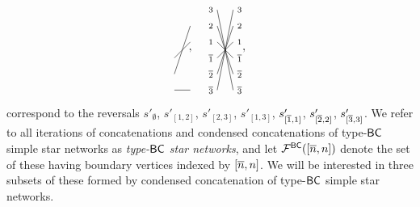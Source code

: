\documentclass[11pt]{article}
\theoremstyle{definition}
\numberwithin{equation}{section}
\begin{document}
\begin{equation}
\begin{tikzpicture}[scale=.5,baseline=0]
\draw[-] (-.5,-0.5) -- (.5,0.5);
\draw[-] (-.5,-1.5) -- (.5,1.5);
\draw[-] (-.5,-2.5) -- (.5,-2.5);
\end{tikzpicture}
\ntnsp,\quad
\begin{tikzpicture}[scale=.5,baseline=0]
  \node at (-.9,2.5) {$\scriptstyle 3$};
  \node at (-.9,1.5) {$\scriptstyle 2$};
  \node at (-.9,0.5) {$\scriptstyle 1$};
  \node at (0.9,2.5) {$\scriptstyle 3$};
  \node at (0.9,1.5) {$\scriptstyle 2$};
  \node at (0.9,0.5) {$\scriptstyle 1$};
  \node at (-.9,-2.5) {$\scriptstyle {\ol 3}$};
  \node at (-.9,-1.5) {$\scriptstyle {\ol 2}$};
  \node at (-.9,-0.5) {$\scriptstyle {\ol 1}$};
  \node at (0.9,-2.5) {$\scriptstyle {\ol 3}$};
  \node at (0.9,-1.5) {$\scriptstyle {\ol 2}$};
  \node at (0.9,-0.5) {$\scriptstyle {\ol 1}$};
\draw[-] (-.5,2.5) -- (.5,-2.5);
\draw[-] (-.5,1.5) -- (.5,-1.5);
\draw[-] (-.5,0.5) -- (.5,-0.5);
\draw[-] (-.5,-0.5) -- (.5,0.5);
\draw[-] (-.5,-1.5) -- (.5,1.5);
\draw[-] (-.5,-2.5) -- (.5,2.5);
\end{tikzpicture}
\ntksp ,
\end{equation}
correspond to the reversals
$s'_\emptyset$, $s'_{[1,2]}$, $s'_{[2,3]}$, $s'_{[1,3]}$, $s'_{[\overline{1},1]}$, $s'_{[\overline{2},2]}$,
$s'_{[\overline{3},3]}$.
We refer to all iterations of concatenations and condensed concatenations
of type-$\mathsf{BC}$ simple star networks as {\em type-$\mathsf{BC}$ star networks},
and let $\mathcal F^{\mathsf{BC}}([\overline{n},n])$ denote the set of these having boundary
vertices indexed by $[\overline{n},n]$.
We will be interested in three subsets of these formed
by condensed concatenation of type-$\mathsf{BC}$ simple star networks.
\end{document}
